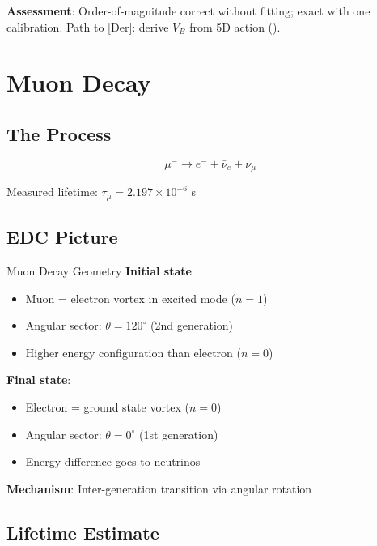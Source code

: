 \textbf{Assessment}: Order-of-magnitude correct without fitting; exact with
one calibration. Path to [Der]: derive $V_B$ from 5D action ().

\section{Muon Decay}
\label{sec:muon_decay}

\subsection{The Process}

\begin{equation}
\mu^- \to e^- + \bar{\nu}_e + \nu_\mu
\end{equation}

Measured lifetime: $\tau_\mu = 2.197 \times 10^{-6}$ s \tagBL

\subsection{EDC Picture}

\begin{mechanism}{Muon Decay Geometry}
\textbf{Initial state} \tagP{}:
\begin{itemize}[nosep]
\item Muon = electron vortex in excited mode ($n = 1$)
\item Angular sector: $\theta = 120^\circ$ (2nd generation)
\item Higher energy configuration than electron ($n = 0$)
\end{itemize}

\textbf{Final state}:
\begin{itemize}[nosep]
\item Electron = ground state vortex ($n = 0$)
\item Angular sector: $\theta = 0^\circ$ (1st generation)
\item Energy difference goes to neutrinos
\end{itemize}

\textbf{Mechanism}: Inter-generation transition via angular rotation
\end{mechanism}

\subsection{Lifetime Estimate}

